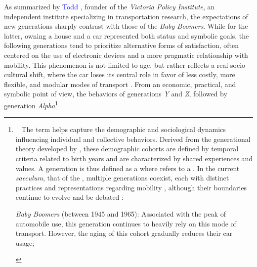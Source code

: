 \begin{refsegment}
As summarized by \textcolor{blue}{Todd} \textcolor{blue}{\textcite[29]{litman_current_2012}}, founder of the \textsl{Victoria Policy Institute}, an independent institute specializing in transportation research, the expectations of new generations sharply contrast with those of the \textsl{Baby Boomers}. While for the latter, owning a house and a car represented both status and symbolic goals, the following generations tend to prioritize alternative forms of satisfaction, often centered on the use of electronic devices and a more pragmatic relationship with mobility. This phenomenon is not limited to age, but rather reflects a real socio-cultural shift, where the car loses its central role in favor of less costly, more flexible, and modular modes of transport \textcolor{blue}{\autocite{peaslee_one_2021}}. From an economic, practical, and symbolic point of view, the behaviors of generations \textsl{Y} and \textsl{Z}, followed by generation \textsl{Alpha}\footnote{~
    The term  helps capture the demographic and sociological dynamics influencing individual and collective behaviors. Derived from the generational theory developed by \textcolor{blue}{\textcite{strauss_generations_1992}}, these demographic cohorts are defined by temporal criteria related to birth years and are characterized by shared experiences and values. A generation is thus defined as a  where  refers to a  \textcolor{blue}{\autocite[60, 64]{strauss_generations_1992}}. In the current \textsl{saeculum}, that of the , multiple generations coexist, each with distinct practices and representations regarding mobility \textcolor{blue}{\autocite[31-57]{howe_millennials_2000}}, although their boundaries continue to evolve and be debated \textcolor{blue}{\autocite[3]{wang_bike_2018}}:
        \begin{customitemize}
    \item \textsl{Baby Boomers} (between 1945 and 1965): Associated with the peak of automobile use, this generation continues to heavily rely on this mode of transport. However, the aging of this cohort gradually reduces their car usage;

\end{customitemize}}
\end{refsegment}
